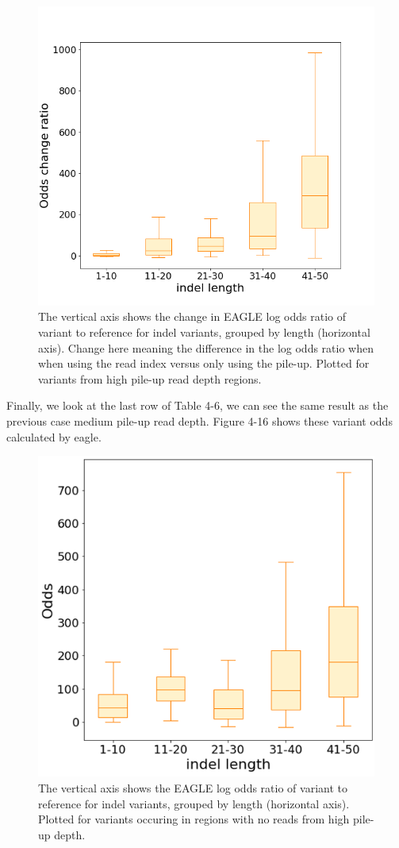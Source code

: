 \begin{figure}[H]
    \centering
    \includegraphics[width=0.6\columnwidth]{body/image/4-15.png}
    \captionsetup{labelfont=bf}
    \renewcommand{\baselinestretch}{1.0}
    \caption[high pile-up read depth odds change ratio]{The vertical axis shows the change in EAGLE log odds ratio of variant to reference for indel variants, grouped by length (horizontal axis).  Change here meaning the difference in the log odds ratio when when using the read index versus only using the pile-up.  Plotted for variants from high pile-up read depth regions.}
    \label{f4-15}
\end{figure}

Finally, we look at the last row of Table 4-6, we can see the same result as the previous case medium pile-up read depth. Figure 4-16 shows these variant odds calculated by eagle.

\begin{figure}[H]
    \centering
    \includegraphics[width=0.6\columnwidth]{body/image/4-16.png}
    \captionsetup{labelfont=bf}
    \renewcommand{\baselinestretch}{1.0}
    \caption[no reads with variants from high pile-up depth odds ratio]{The vertical axis shows the EAGLE log odds ratio of variant to reference for indel variants, grouped by length (horizontal axis).  Plotted for variants occuring in regions with no reads from high pile-up depth.}
    \label{f4-16}
\end{figure}


